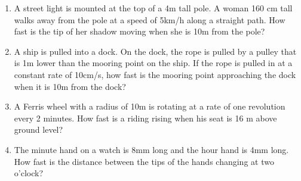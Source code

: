 \begin{enumerate}
\begin{itemize}
\end{itemize} 

\item 
A street light is mounted at the top of a 4m tall pole. A woman 160 cm tall walks away from the pole at a speed of 5km/h along a straight path. How fast is the tip of her shadow moving when she is 10m from the pole?


\item 
A ship is pulled into a dock. On the dock, the rope is pulled by a pulley that is 1m lower than the mooring point on the ship. If the rope is pulled in at a constant rate of 10cm/s, how fast is the mooring point approaching the dock when it is 10m from the dock?

\item 
A Ferris wheel with a radius of 10m is rotating at a rate of one revolution every 2 minutes. How fast is a riding rising when his seat is 16 m above ground level?

\item 
The minute hand on a watch is 8mm long and the hour hand is 4mm long. How fast is the distance between the tips of the hands changing at two o'clock?
\end{enumerate}


